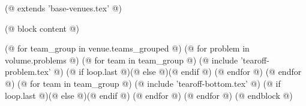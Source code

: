 (@ extends 'base-venues.tex' @)

(@ block content @)
    \pagestyle{tearoff}

    (@ for team_group in venue.teams_grouped @)
        (@ for problem in volume.problems @)
            (@ for team in team_group @)%
                (@ include 'tearoff-problem.tex' @)
                (@ if loop.last @)\newpage(@ else @)\vspace*{-1mm}(@ endif @)
            (@ endfor @)
        (@ endfor @)
        (@ for team in team_group @)%
            (@ include 'tearoff-bottom.tex' @)
            (@ if loop.last @)\newpage(@ else @)\vspace*{-1mm}(@ endif @)
        (@ endfor @)
    (@ endfor @)
(@ endblock @)
